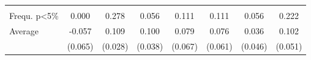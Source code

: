\begin{table}
\begin{tabular}[t]{lccccccc}
\addlinespace[0.3em]
\multicolumn{8}{l}{\textbf{Annual}}\\
\hspace{1em}Frequ. p<5\% & 0.000 & 0.278 & 0.056 & 0.111 & 0.111 & 0.056 & 0.222\\
\hspace{1em}Average & -0.057 & 0.109 & 0.100 & 0.079 & 0.076 & 0.036 & 0.102\\
\hspace{1em} & (0.065) & (0.028) & (0.038) & (0.067) & (0.061) & (0.046) & (0.051)\\
\bottomrule
\end{tabular}
\end{table}
